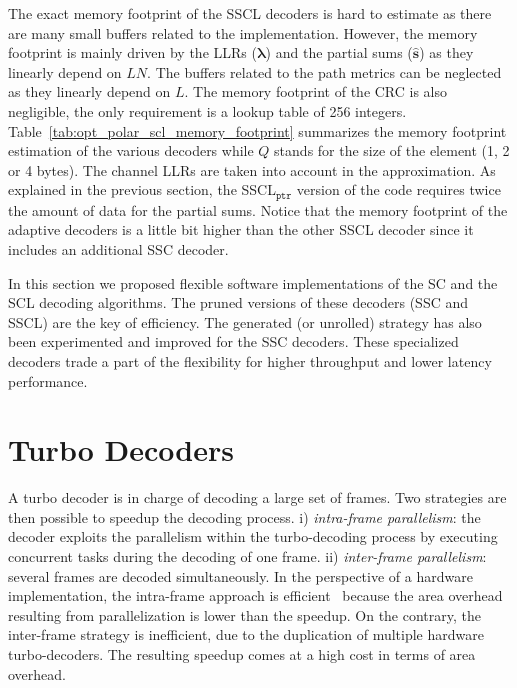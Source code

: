 The exact memory footprint of the SSCL decoders is hard to estimate as there are
many small buffers related to the implementation. However, the memory footprint
is mainly driven by the LLRs ($\bm{\lambda}$) and the partial sums
($\bm{\hat{s}}$) as they linearly depend on $LN$. The buffers related to the
path metrics can be neglected as they linearly depend on $L$. The memory
footprint of the CRC is also negligible, the only requirement is a lookup table
of 256 integers. Table~\ref{tab:opt_polar_scl_memory_footprint} summarizes the
memory footprint estimation of the various decoders while $Q$ stands for the
size of the element (1, 2 or 4 bytes). The channel LLRs are taken into account
in the approximation. As explained in the previous section, the
SSCL$_{\texttt{ptr}}$ version of the code requires twice the amount of data for
the partial sums. Notice that the memory footprint of the adaptive decoders is a
little bit higher than the other SSCL decoder since it includes an additional
SSC decoder.

In this section we proposed flexible software implementations of the SC and the
SCL decoding algorithms. The pruned versions of these decoders (SSC and SSCL)
are the key of efficiency. The generated (or unrolled) strategy has also been
experimented and improved for the SSC decoders. These specialized decoders trade
a part of the flexibility for higher throughput and lower latency performance.

\section{Turbo Decoders}

A turbo decoder is in charge of decoding a large set of frames. Two strategies
are then possible to speedup the decoding process. i)
\textit{intra-frame parallelism}: the decoder exploits the parallelism within
the turbo-decoding process by executing concurrent tasks during
the decoding of one frame. ii) \textit{inter-frame parallelism}: several frames
are decoded simultaneously. In the perspective of a hardware implementation, the
intra-frame approach is efficient~\cite{Muller2009} because the area overhead
resulting from parallelization is lower than the speedup. On the contrary, the
inter-frame strategy is inefficient, due to the duplication of multiple hardware
turbo-decoders. The resulting speedup comes at a high cost in terms of area
overhead.

